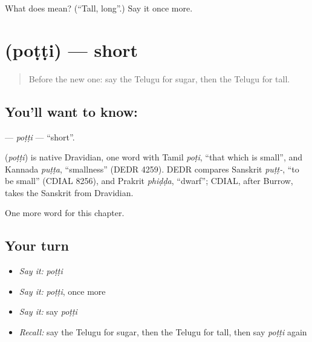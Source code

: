 \begin{tcolorbox}[breakable,colback=teal!4,colframe=teal!35!black,title={Before you move on}]
What does  mean? (\textquotedblleft{}Tall, long\textquotedblright{}.) Say it once more.
\end{tcolorbox}
\section[\texorpdfstring{\te{పొట్టి} (poṭṭi)}{పొట్టి (poṭṭi)}]{ (poṭṭi) — short}

\label{lesson:TE-C136-potti}



\begin{quote}
Before the new one: say the Telugu for sugar, then the Telugu for tall.
\end{quote}

\subsection*{You'll want to know: }
\textbf{} — \emph{poṭṭi} — \textquotedblleft{}short\textquotedblright{}.

\begin{cousinweb}
\textbf{} (\emph{poṭṭi}) is native Dravidian, one word with Tamil \emph{poṭi}, \textquotedblleft{}that which is small\textquotedblright{}, and Kannada \emph{puṭṭa}, \textquotedblleft{}smallness\textquotedblright{} (DEDR 4259). DEDR compares Sanskrit \emph{puṭṭ-}, \textquotedblleft{}to be small\textquotedblright{} (CDIAL 8256), and Prakrit \emph{phiḍḍa}, \textquotedblleft{}dwarf\textquotedblright{}; CDIAL, after Burrow, takes the Sanskrit from Dravidian.
\end{cousinweb}

\begin{grammarlens}[title={What you've built}]
One more word for this chapter.
\end{grammarlens}

\subsection*{Your turn}
\begin{itemize}
\raggedright
  \item \emph{Say it:} \emph{poṭṭi}
  \item \emph{Say it:} \emph{poṭṭi}, once more
  \item \emph{Say it:} say \emph{poṭṭi}
  \item \emph{Recall:} say the Telugu for sugar, then the Telugu for tall, then say \emph{poṭṭi} again
\end{itemize}

